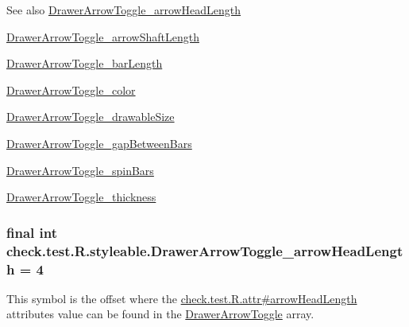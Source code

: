 \begin{DoxySeeAlso}{See also}
\hyperlink{classcheck_1_1test_1_1_r_1_1styleable_ac0647576f04a6d1d20c113fe5f620549}{Drawer\+Arrow\+Toggle\+\_\+arrow\+Head\+Length} 

\hyperlink{classcheck_1_1test_1_1_r_1_1styleable_a5470f2b363de031a61f66e7cb6730f40}{Drawer\+Arrow\+Toggle\+\_\+arrow\+Shaft\+Length} 

\hyperlink{classcheck_1_1test_1_1_r_1_1styleable_ad0c002a6830ad6d7027b2a71aaae6f7d}{Drawer\+Arrow\+Toggle\+\_\+bar\+Length} 

\hyperlink{classcheck_1_1test_1_1_r_1_1styleable_aab0db7b5e25645f9ddc44b92a639dfa8}{Drawer\+Arrow\+Toggle\+\_\+color} 

\hyperlink{classcheck_1_1test_1_1_r_1_1styleable_a4d2ffe9ec6395dfd049a6a31e683caea}{Drawer\+Arrow\+Toggle\+\_\+drawable\+Size} 

\hyperlink{classcheck_1_1test_1_1_r_1_1styleable_a44d301c2d203c5db285393f8159327c4}{Drawer\+Arrow\+Toggle\+\_\+gap\+Between\+Bars} 

\hyperlink{classcheck_1_1test_1_1_r_1_1styleable_a73da5fd0bc10c0ae2fa7bcb46d75899e}{Drawer\+Arrow\+Toggle\+\_\+spin\+Bars} 

\hyperlink{classcheck_1_1test_1_1_r_1_1styleable_a3245f5a85d7d25f1960c495b486d78e6}{Drawer\+Arrow\+Toggle\+\_\+thickness} 
\end{DoxySeeAlso}
\hypertarget{classcheck_1_1test_1_1_r_1_1styleable_ac0647576f04a6d1d20c113fe5f620549}{}
\subsubsection[{Drawer\+Arrow\+Toggle\+\_\+arrow\+Head\+Length}]{\setlength{\rightskip}{0pt plus 5cm}final int check.\+test.\+R.\+styleable.\+Drawer\+Arrow\+Toggle\+\_\+arrow\+Head\+Length = 4\hspace{0.3cm}{\ttfamily [static]}}\label{classcheck_1_1test_1_1_r_1_1styleable_ac0647576f04a6d1d20c113fe5f620549}
This symbol is the offset where the \hyperlink{classcheck_1_1test_1_1_r_1_1attr_aea9df94f1b7f07026ded34d24018677d}{check.\+test.\+R.\+attr\#arrow\+Head\+Length} attribute\textquotesingle{}s value can be found in the \hyperlink{classcheck_1_1test_1_1_r_1_1styleable_a3bd2348d01049d5d42d5b7f277abeec9}{Drawer\+Arrow\+Toggle} array.

